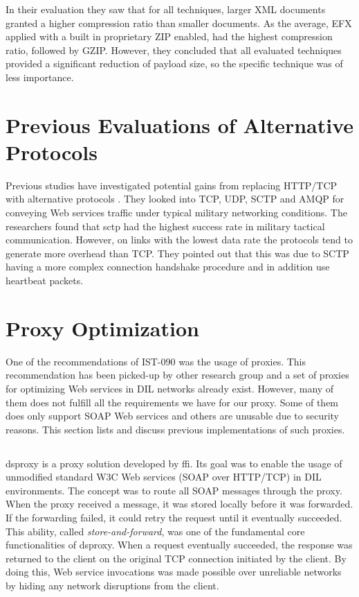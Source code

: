 In their evaluation they saw that for all techniques, larger XML documents
granted a higher compression ratio than smaller documents. As the average, EFX
applied with a built in proprietary ZIP enabled, had the highest compression
ratio, followed by GZIP. However, they concluded that all evaluated techniques
provided a significant reduction of payload size, so the specific technique was
of less importance.


\section{Previous Evaluations of Alternative Protocols}

Previous studies have investigated potential gains from replacing HTTP/TCP with
alternative protocols \cite{evaluation-transport-protocols-web-services}. They
looked into TCP, UDP, SCTP and AMQP for conveying Web services traffic under
typical military networking conditions. The researchers found that \gls{sctp}
had the highest success rate in military tactical communication. However, on
links with the lowest data rate the protocols tend to generate more overhead
than TCP. They pointed out that this was due to SCTP having a more complex
connection handshake procedure and in addition use heartbeat packets.

\section{Proxy Optimization}

One of the recommendations of IST-090 was the usage of proxies. This
recommendation has been picked-up by other research group and a set of proxies
for optimizing Web services in DIL networks already exist. However, many of them
does not fulfill all the requirements we have for our proxy. Some of them does
only support SOAP Web services and others are unusable due to security reasons.
This section lists and discuss previous implementations of such proxies.

\subsection{}

\gls{dsproxy} is a proxy solution developed by
\gls{ffi}\cite{dsproxy-ffi}\cite{ieee-dsproxy}. Its goal was to enable the usage
of unmodified standard W3C Web services (SOAP over HTTP/TCP) in DIL
environments. The concept was to route all SOAP messages through the proxy. When
the proxy received a message, it was stored locally before it was forwarded. If
the forwarding failed, it could retry the request until it eventually succeeded.
This ability, called \textit{store-and-forward}, was one of the fundamental core
functionalities of \gls{dsproxy}. When a request eventually succeeded, the
response was returned to the client on the original TCP connection initiated by
the client. By doing this, Web service invocations was made possible over
unreliable networks by hiding any network disruptions from the client.

